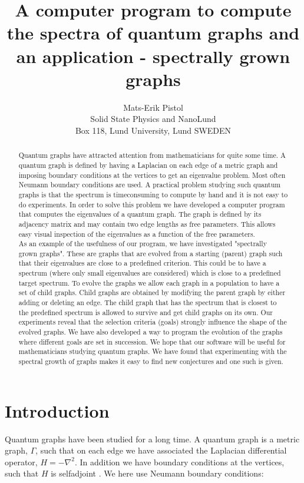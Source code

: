 \documentclass[a4paper]{article}
\title{A computer program to compute the spectra of quantum graphs and an application - spectrally grown graphs}
\author{Mats-Erik Pistol\\ Solid State Physics and NanoLund\\ Box 118, Lund University, Lund SWEDEN}
\begin{document}
\maketitle

\begin{abstract}
Quantum graphs have attracted attention from mathematicians for quite some time. A quantum graph is defined by having a Laplacian on each edge of a metric graph and imposing boundary conditions at the vertices to get an eigenvalue problem. Most often Neumann boundary conditions are used. A practical problem studying such quantum graphs is that the spectrum is timeconsuming to compute by hand and it is not easy to do experiments. In order to solve this problem we have developed a computer program that computes the  eigenvalues of a quantum graph. The graph is defined by its adjacency matrix and may contain two edge lengths as free parameters. This allows easy visual inspection of the eigenvalues as a function of the free parameters.\\ As an example of the usefulness of our program, we have investigated "spectrally grown graphs". These are graphs that are evolved from a starting (parent) graph such that their eigenvalues are close to a predefined criterion. This could be to have a spectrum (where only small eigenvalues are considered) which is close to a predefined target spectrum. To evolve the graphs we allow each graph in a population to have a set of child graphs. Child graphs are obtained by modifying the parent graph by either adding or deleting an edge. The child graph that has the spectrum that is closest to the predefined spectrum is allowed to survive and get child graphs on its own. Our experiments reveal that the selection criteria (goals) strongly influence the shape of the evolved graphs. We have also developed a way to program the evolution of the graphs where different goals are set in succession.
We hope that our software will be useful for mathematicians studying quantum graphs. We have found that experimenting with the spectral growth of graphs makes it easy to find new conjectures and one such is given.

\end{abstract}

\section{Introduction}

Quantum graphs have been studied for a long time. A quantum graph \cite{kuchment2004quantum} is a metric graph, $\Gamma$, such that on each edge we have associated the Laplacian differential operator, $H=-\nabla^2$. In addition we have boundary conditions at the vertices, such that $H$ is selfadjoint \cite{kostrykin1999kirchhoff}. We here use Neumann boundary conditions:
      
\end{document}
